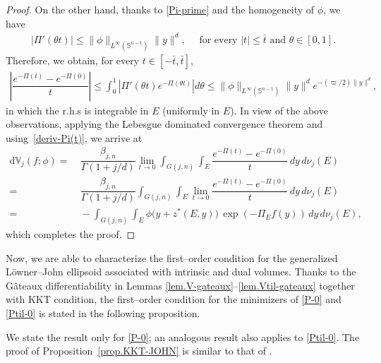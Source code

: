 \documentclass[11pt]{article}
\theoremstyle{definition}
\numberwithin{equation}{section}
\newcommand{\Gr}[2]{G(#1,#2)}        %
\newcommand{\opV}{\mathds{V}}       %
\begin{document}
\begin{proof}
On the other hand, thanks to \eqref{Pi-prime} and the homogeneity of $\phi$, we have
\begin{align*}
    |\Pi'(\theta t)| \leq \| \phi \|_{L^\infty(\mathbb S^{n - 1})} \| y \|^d, \quad \text{ for every } |t| \leq \bar t \text{ and } \theta \in [0, 1].
\end{align*}
Therefore, we obtain, for every $t \in [- \bar t, \bar t]$,
\begin{align*}
    \left\vert \dfrac{e^{-\Pi(t)} - e^{-\Pi(0)} }{t} \right\vert \leq \int_0^1 |\Pi'(\theta t)e^{-\Pi(\theta t)}| d\theta \leq \| \phi \|_{L^\infty(\mathbb S^{n - 1})} \| y \|^d e^{- (\varpi/2) \| y \|^d},
\end{align*}
in which the r.h.s is integrable in $E$ (uniformly in $E$).
In view of the above observations, applying the Lebesgue dominated convergence theorem and using~\eqref{deriv-Pi(t)}, we arrive at 
\begin{align*}
    \mathrm d\opV_j(f;\phi) = & ~ 
    \dfrac{\beta_{j, n}}{\Gamma(1 + j/d)} \lim_{t \to 0} \int_{\Gr{j}{n}} \int_E \dfrac{e^{- \Pi(t)} - e^{- \Pi(0)} }{t} \, dy \, d\nu_j(E) \\
    = & ~ 
    \dfrac{\beta_{j, n}}{\Gamma(1 + j/d)} \int_{G(j, n)} \int_E \lim_{t \to 0} \dfrac{e^{- \Pi(t)} - e^{- \Pi(0)} }{t} \, dy \, d\nu_j(E) \\
    = & ~ - \int_{\Gr{j}{n}} \int_E \phi\big(y+z^\ast(E,y)\big)\, \exp(-\Pi_E f(y)) \, dy \, d\nu_j(E),
\end{align*}
which completes the proof.
\end{proof}

Now, we are able to characterize the first--order condition for the generalized L\"owner--John ellipsoid associated with intrinsic and dual volumes. 
Thanks to the G\^ateaux differentiability in Lemmas \ref{lem.V-gateaux}--\ref{lem.Vtil-gateaux} together with KKT condition, the first--order condition for the minimizers of \eqref{P-0} and \eqref{Ptil-0} is stated in the following proposition.

\medskip

We state the result only for \eqref{P-0}; an analogous result also applies to \eqref{Ptil-0}. 
The proof of Proposition~\ref{prop.KKT-JOHN} is similar to that of \cite[Theorem 3.2]{La_2015}.
\medskip
\end{document}
